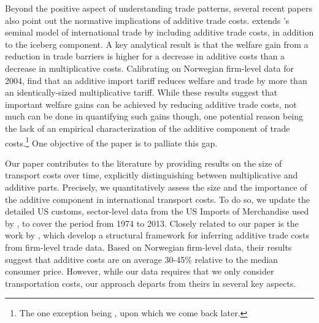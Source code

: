 \documentclass[a4paper,11pt]{article}
\begin{document}
Beyond the positive aspect of understanding trade patterns, several recent papers also point out the normative implications of additive trade costs. \citet{sorensen2014} extends \citet{melitz}'s seminal model of international trade by including additive trade costs, in addition to the iceberg component. A key analytical result is that the welfare gain from a reduction in trade barriers is higher for a decrease in additive costs than a decrease in multiplicative costs. Calibrating on Norwegian firm-level data for 2004, \citet{Irrazabal_2015} find that an additive import tariff reduces welfare and trade by more than an identically-sized multiplicative tariff. While these results suggest that important welfare gains can be achieved by reducing additive trade costs, not much can be done in quantifying such gains though, one potential reason being the lack of an empirical characterization of the additive component of trade costs.\footnote{The one exception being \citet{Irrazabal_2015}, upon which we come back later.} One objective of the paper is to palliate this gap. \bigskip


Our paper contributes to the literature by providing results on the size of transport costs over time, explicitly distinguishing between multiplicative and additive parts. Precisely, we quantitatively assess the size and the importance of the additive component in international transport costs. To do so, we update the detailed US customs, sector-level data from the US Imports of Merchandise used by \citet{hummels2007}, to cover the period from 1974 to 2013. Closely related to our paper is the work by \citet{Irrazabal_2015}, which develop a structural framework for inferring additive trade costs from firm-level trade data. Based on Norwegian firm-level data, their results suggest that additive costs are on average 30-45\% relative to the median consumer price. However, while our data requires that we only consider transportation costs, our approach departs from theirs in several key aspects.
\end{document}
